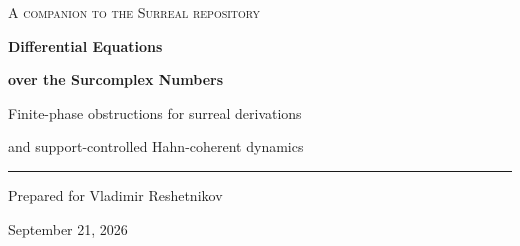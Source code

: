 \documentclass[11pt,letterpaper]{article}
\numberwithin{equation}{section}
\theoremstyle{definition}
\theoremstyle{remark}
\newcommand{\No}{\mathbf{No}}
\newcommand{\mm}{\mathfrak m}
\newcommand{\D}{\partial}
\begin{document}
\hypersetup{pageanchor=false}
\begin{titlepage}
\centering
\vspace*{0.1in}
{\large\scshape A companion to the Surreal repository\par}
\vspace{0.2in}
{\Huge\bfseries Differential Equations\par}
\vspace{0.05in}
{\Huge\bfseries over the Surcomplex Numbers\par}
\vspace{0.15in}
{\Large Finite-phase obstructions for surreal derivations\par}
\vspace{0.04in}
{\Large and support-controlled Hahn-coherent dynamics\par}
\vspace{0.15in}
{\color{accent}\rule{0.85\textwidth}{1.2pt}\par}
\vspace{0.12in}
{\large Prepared for Vladimir Reshetnikov\par}
{\large September 21, 2026\par}
\vspace{0.15in}
\begin{minipage}{0.91\textwidth}
\begin{abstract}
The repository carefully distinguishes coordinate differentiation, formal
parameter differentiation, and differentiation of surreal numbers, but its
computer-algebra discussion stops short of a solution theory connecting those
choices. This article supplies such a theory in two deliberately separate
categories.

For the Berarducci--Mantova derivation $\D$, normalized by $\D\omega=1$, we
prove an exact rank-one criterion: $\D y=(a+ib)y$ has a nonzero solution in
$\No[i]$ if and only if $b$ has a finite surreal antiderivative. Equivalently,
\[
 \left\{\frac{\D y}{y}:y\in\No[i]^{\times}\right\}
       =\No+i\D\mm.
\]
Thus algebraic closure and surjective additive integration do not supply all
complex exponential solutions. An explicit infinite-phase obstruction,
sharp power and iterated-logarithm thresholds, a harmonic-oscillator
nonexistence proof, and exact Laurent-series resolvents make the criterion
concrete.


\end{abstract}
\end{minipage}
\end{titlepage}
\end{document}
